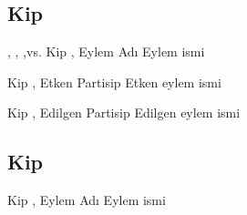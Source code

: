 


\subsection*{Kip }


\begin{kip}{, , ,vs.}
  {Kip , Eylem Adı}
  Eylem ismi
\end{kip}

\begin{kip}{}{Kip , Etken Partisip}
  Etken eylem ismi
\end{kip}

\begin{kip}{}{Kip , Edilgen Partisip}
  Edilgen eylem ismi
\end{kip}



\subsection*{Kip }

\begin{kip}{}{Kip , Eylem Adı}
  Eylem ismi
\end{kip}

